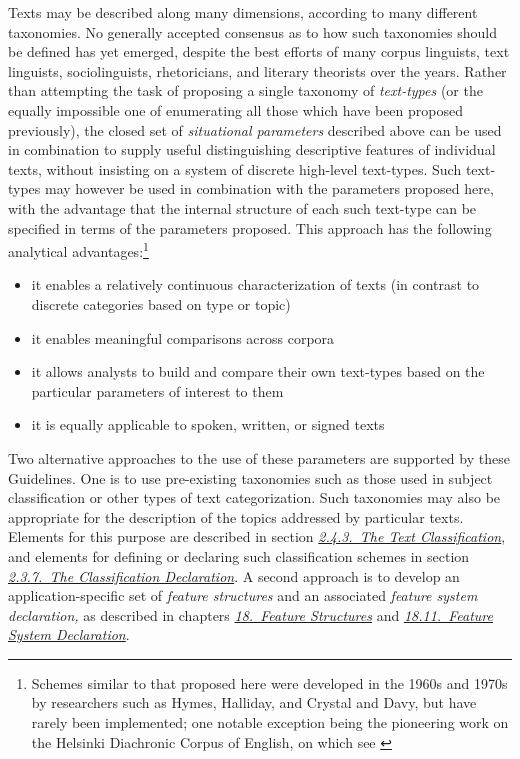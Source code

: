 Texts may be described along many dimensions, according to many different taxonomies. No generally accepted consensus as to how such taxonomies should be defined has yet emerged, despite the best efforts of many corpus linguists, text linguists, sociolinguists, rhetoricians, and literary theorists over the years. Rather than attempting the task of proposing a single taxonomy of \textit{text-types} (or the equally impossible one of enumerating all those which have been proposed previously), the closed set of \textit{situational parameters} described above can be used in combination to supply useful distinguishing descriptive features of individual texts, without insisting on a system of discrete high-level text-types. Such text-types may however be used in combination with the parameters proposed here, with the advantage that the internal structure of each such text-type can be specified in terms of the parameters proposed. This approach has the following analytical advantages:\footnote{Schemes similar to that proposed here were developed in the 1960s and 1970s by researchers such as Hymes, Halliday, and Crystal and Davy, but have rarely been implemented; one notable exception being the pioneering work on the Helsinki Diachronic Corpus of English, on which see \cite{CC-BIBL-1}} \begin{itemize}
\item it enables a relatively continuous characterization of texts (in contrast to discrete categories based on type or topic)
\item it enables meaningful comparisons across corpora
\item it allows analysts to build and compare their own text-types based on the particular parameters of interest to them
\item it is equally applicable to spoken, written, or signed texts
\end{itemize} \par
Two alternative approaches to the use of these parameters are supported by these Guidelines. One is to use pre-existing taxonomies such as those used in subject classification or other types of text categorization. Such taxonomies may also be appropriate for the description of the topics addressed by particular texts. Elements for this purpose are described in section \textit{\hyperref[HD43]{2.4.3.\ The Text Classification}}, and elements for defining or declaring such classification schemes in section \textit{\hyperref[HD55]{2.3.7.\ The Classification Declaration}}. A second approach is to develop an application-specific set of \textit{feature structures} and an associated \textit{feature system declaration,} as described in chapters \textit{\hyperref[FS]{18.\ Feature Structures}} and \textit{\hyperref[FD]{18.11.\ Feature System Declaration}}.\par
